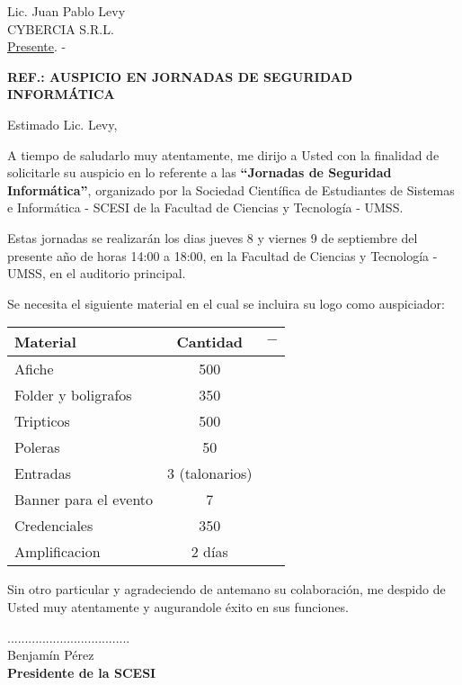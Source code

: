 \documentclass[letterpaper,12pt]{letter}
\begin{document}
\date {11 de agosto de 2011}

\begin{letter}{Lic. Juan Pablo Levy \\ CYBERCIA S.R.L. \\\underline {Presente}. -}

\begin{center}
	\opening{\textbf{REF.: AUSPICIO EN JORNADAS DE SEGURIDAD INFORM\'ATICA}}
\end{center}

Estimado Lic. Levy,

A tiempo de saludarlo muy atentamente, me dirijo a Usted con la finalidad de solicitarle su auspicio en lo referente 
a las {\bfseries ``Jornadas de Seguridad Inform\'atica''}, organizado por la Sociedad Cient\'ifica de Estudiantes de 
Sistemas e Inform\'atica - SCESI de la Facultad de Ciencias y Tecnolog\'ia - UMSS.

Estas jornadas se realizar\'an los dias jueves 8 y viernes 9 de septiembre del presente a\~no de horas 14:00 a 
18:00, en la Facultad de Ciencias y Tecnolog\'ia - UMSS, en el auditorio principal.

Se necesita el siguiente material en el cual se incluira su logo como auspiciador:

\begin{tabular}{|l|c|c|}
\hline
{\bfseries Material} & {\bfseries Cantidad} & $-$ \\
\hline
Afiche & 500 & \\
\hline
Folder y boligrafos & 350 & \\
\hline
Tripticos & 500 & \\
\hline
Poleras & 50 & \\
\hline
Entradas & 3 (talonarios) & \\
\hline
Banner para el evento & 7 & \\
\hline
Credenciales & 350 & \\
\hline
Amplificacion & 2 d\'ias & \\
\hline
\end{tabular}

Sin otro particular y agradeciendo de antemano su colaboraci\'on, me despido de Usted muy atentamente y augurandole \'exito en sus funciones.\\

\vspace{1cm}

\begin{center}
...................................\\
Benjam\'in P\'erez\\
{\bfseries Presidente de la  SCESI}
\end{center}

\end{letter}
\end{document}
